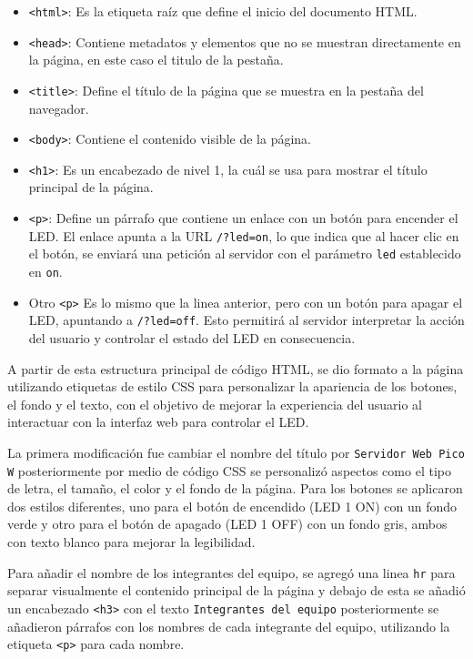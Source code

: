 \documentclass[letterpaper,12pt]{article}
\begin{document}
    \begin{itemize}
        \item \texttt{<html>}: Es la etiqueta raíz que define el inicio del documento HTML.
        \item \texttt{<head>}: Contiene metadatos y elementos que no se muestran directamente en la página, en este caso el titulo de la pestaña.
        \item \texttt{<title>}: Define el título de la página que se muestra en la pestaña del navegador.
        \item \texttt{<body>}: Contiene el contenido visible de la página.
        \item \texttt{<h1>}: Es un encabezado de nivel 1, la cuál se usa para mostrar el título principal de la página.
        \item \texttt{<p>}: Define un párrafo que contiene un enlace con un botón para encender el LED. El enlace apunta a la URL \texttt{/?led=on}, lo que indica que al hacer clic en el botón, se enviará una petición al servidor con el parámetro  \texttt{led} establecido en \texttt{\texttt{on}}.
        \item Otro \texttt{<p>} Es lo mismo que la linea anterior, pero con un botón para apagar el LED, apuntando a \texttt{/?led=off}. Esto permitirá al servidor interpretar la acción del usuario y controlar el estado del LED en consecuencia. 
    \end{itemize}

    A partir de esta estructura principal de código HTML, se dio formato a la página utilizando etiquetas de estilo CSS para personalizar la apariencia de los botones, el fondo y el texto, con el objetivo de mejorar la experiencia del usuario al interactuar con la interfaz web para controlar el LED.

    La primera modificación fue cambiar el nombre del título por \texttt{Servidor Web Pico W} posteriormente por medio de código CSS se personalizó aspectos como el tipo de letra, el tamaño, el color y el fondo de la página. Para los botones se aplicaron dos estilos diferentes, uno para el botón de encendido (LED 1 ON) con un fondo verde y otro para el botón de apagado (LED 1 OFF) con un fondo gris, ambos con texto blanco para mejorar la legibilidad. 

    Para añadir el nombre de los integrantes del equipo, se agregó una linea \texttt{hr} para separar visualmente el contenido principal de la página y debajo de esta se añadió un encabezado \texttt{<h3>} con el texto \texttt{Integrantes del equipo} posteriormente se añadieron párrafos con los nombres de cada integrante del equipo, utilizando la etiqueta \texttt{<p>} para cada nombre.
\end{document}
